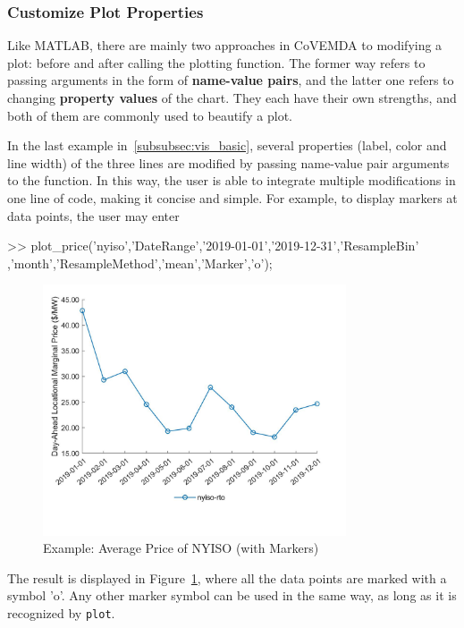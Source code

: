 \documentclass[10pt]{article}
\newcommand{\covemda}{CoVEMDA}
\newcommand{\matlab}{\textsc{MATLAB}}
\numberwithin{equation}{section}
\numberwithin{table}{section}
\numberwithin{figure}{section}
\begin{document}
\subsubsection{Customize Plot Properties} \label{subsubsec:vis_cus}

Like \matlab{}, there are mainly two approaches in \covemda{} to modifying a plot: before and after calling the plotting function. The former way refers to passing arguments in the form of \textbf{name-value pairs}, and the latter one refers to changing \textbf{property values} of the chart. They each have their own strengths, and both of them are commonly used to beautify a plot.

In the last example in~\ref{subsubsec:vis_basic}, several properties (label, color and line width) of the three lines are modified by passing name-value pair arguments to the function. In this way, the user is able to integrate multiple modifications in one line of code, making it concise and simple. For example, to display markers at data points, the user may enter

\begin{Command}
>> plot_price('nyiso','DateRange',{'2019-01-01','2019-12-31'},'ResampleBin'
   ,'month','ResampleMethod','mean','Marker','o');
\end{Command}

\begin{figure}
  \centering
  \noindent\includegraphics[width=0.8\textwidth]{figures/visualization_example4.jpg}
  \caption{Example: Average Price of NYISO (with Markers)} \label{fig:vis_eg4}
\end{figure}

The result is displayed in Figure~\ref{fig:vis_eg4}, where all the data points are marked with a symbol 'o'. Any other marker symbol can be used in the same way, as long as it is recognized by \verb!plot!.
\end{document}
